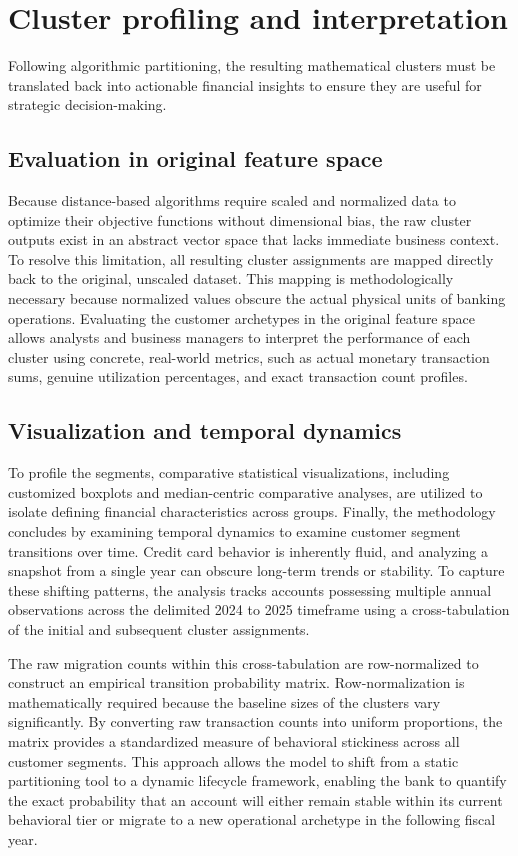     \section{Cluster profiling and interpretation}
    \label{sec:cluster_profiling}
    Following algorithmic partitioning, the resulting mathematical clusters must be translated back into actionable financial insights to ensure they are useful for strategic decision-making.
    
        \subsection{Evaluation in original feature space}
        \label{subsec:original_space_evaluation}
        Because distance-based algorithms require scaled and normalized data to optimize their objective functions without dimensional bias, the raw cluster outputs exist in an abstract vector space that lacks immediate business context. To resolve this limitation, all resulting cluster assignments are mapped directly back to the original, unscaled dataset. This mapping is methodologically necessary because normalized values obscure the actual physical units of banking operations. Evaluating the customer archetypes in the original feature space allows analysts and business managers to interpret the performance of each cluster using concrete, real-world metrics, such as actual monetary transaction sums, genuine utilization percentages, and exact transaction count profiles. 
        
        \subsection{Visualization and temporal dynamics}
        \label{subsec:temporal_dynamics_method}
        To profile the segments, comparative statistical visualizations, including customized boxplots and median-centric comparative analyses, are utilized to isolate defining financial characteristics across groups. Finally, the methodology concludes by examining temporal dynamics to examine customer segment transitions over time. Credit card behavior is inherently fluid, and analyzing a snapshot from a single year can obscure long-term trends or stability. To capture these shifting patterns, the analysis tracks accounts possessing multiple annual observations across the delimited 2024 to 2025 timeframe using a cross-tabulation of the initial and subsequent cluster assignments.
        
        The raw migration counts within this cross-tabulation are row-normalized to construct an empirical transition probability matrix. Row-normalization is mathematically required because the baseline sizes of the clusters vary significantly. By converting raw transaction counts into uniform proportions, the matrix provides a standardized measure of behavioral stickiness across all customer segments. This approach allows the model to shift from a static partitioning tool to a dynamic lifecycle framework, enabling the bank to quantify the exact probability that an account will either remain stable within its current behavioral tier or migrate to a new operational archetype in the following fiscal year.
        

